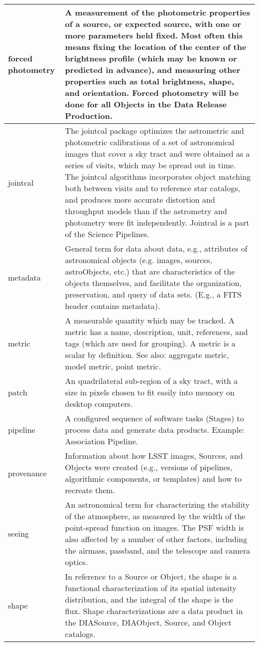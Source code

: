 \begin{longtable}{|l|p{}|}
forced photometry & A measurement of the photometric properties of a source, or expected source, with one or more parameters held fixed. Most often this means fixing the location of the center of the brightness profile (which may be known or predicted in advance), and measuring other properties such as total brightness, shape, and orientation. Forced photometry will be done for all Objects in the Data Release Production. \\\hline
jointcal & The jointcal package optimizes the astrometric and photometric calibrations of a set of astronomical images that cover a sky tract and were obtained as a series of visits, which may be spread out in time. The jointcal algorithms incorporates object matching both between visits and to reference star catalogs, and produces more accurate distortion and throughput models than if the astrometry and photometry were fit independently. Jointcal is a part of the Science Pipelines. \\\hline
metadata & General term for data about data, e.g., attributes of astronomical objects (e.g. images, sources, astroObjects, etc.) that are characteristics of the objects themselves, and facilitate the organization, preservation, and query of data sets. (E.g., a FITS header contains metadata). \\\hline
metric & A measurable quantity which may be tracked. A metric has a name, description, unit, references, and tags (which are used for grouping). A metric is a scalar by definition. See also: aggregate metric, model metric, point metric. \\\hline
patch & An quadrilateral sub-region of a sky tract, with a size in pixels chosen to fit easily into memory on desktop computers. \\\hline
pipeline & A configured sequence of software tasks (Stages) to process data and generate data products. Example: Association Pipeline. \\\hline
provenance & Information about how LSST images, Sources, and Objects were created (e.g., versions of pipelines, algorithmic components, or templates) and how to recreate them. \\\hline
seeing & An astronomical term for characterizing the stability of the atmosphere, as measured by the width of the point-spread function on images. The PSF width is also affected by a number of other factors, including the airmass, passband, and the telescope and camera optics. \\\hline
shape & In reference to a Source or Object, the shape is a functional characterization of its spatial intensity distribution, and the integral of the shape is the flux. Shape characterizations are a data product in the DIASource, DIAObject, Source, and Object catalogs. \\\hline

\end{longtable}
